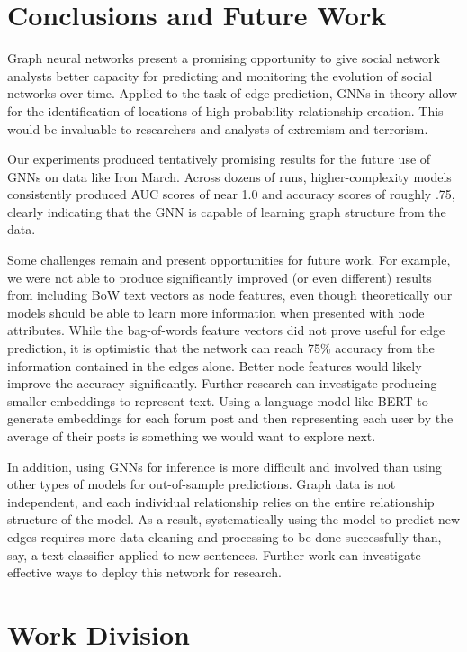 \documentclass[10pt,twocolumn,letterpaper]{article}
\begin{document}
\section{Conclusions and Future Work}

Graph neural networks present a promising opportunity to give social network analysts better capacity for predicting and monitoring the evolution of social networks over time. Applied to the task of edge prediction, GNNs in theory allow for the identification of locations of high-probability relationship creation. This would be invaluable to researchers and analysts of extremism and terrorism.

Our experiments produced tentatively promising results for the future use of GNNs on data like Iron March. Across dozens of runs, higher-complexity models consistently produced AUC scores of near 1.0 and accuracy scores of roughly .75, clearly indicating that the GNN is capable of learning graph structure from the data. 

Some challenges remain and present opportunities for future work. For example, we were not able to produce significantly improved (or even different) results from including BoW text vectors as node features, even though theoretically our models should be able to learn more information when presented with node attributes. While the bag-of-words feature vectors did not prove useful for edge prediction, it is optimistic that the network can reach 75\% accuracy from the information contained in the edges alone. Better node features would likely improve the accuracy significantly. Further research can investigate producing smaller embeddings to represent text. Using a language model like BERT to generate embeddings for each forum post and then representing each user by the average of their posts is something we would want to explore next.

In addition, using GNNs for inference is more difficult and involved than using other types of models for out-of-sample predictions. Graph data is not independent, and each individual relationship relies on the entire relationship structure of the model. As a result, systematically using the model to predict new edges requires more data cleaning and processing to be done successfully than, say, a text classifier applied to new sentences. Further work can investigate effective ways to deploy this network for research. 


\section{Work Division}
\end{document}
